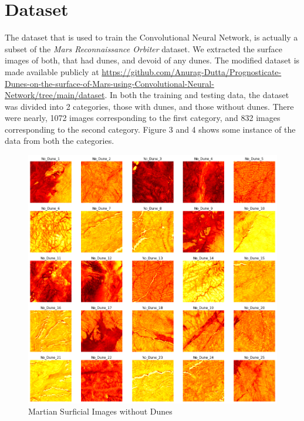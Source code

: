 \documentclass[conference]{IEEEtran}
\begin{document}
\section{Dataset}
The dataset that is used to train the Convolutional Neural Network, is actually a subset of the \textit{Mars Reconnaissance Orbiter} dataset. We extracted the surface images of both, that had dunes, and devoid of any dunes. The modified dataset is made available publicly at \href{https://github.com/Anurag-Dutta/Prognosticate-Dunes-on-the-surface-of-Mars-using-Convolutional-Neural-Network/tree/main/dataset}{https://github.com/Anurag-Dutta/Prognosticate-Dunes-on-the-surface-of-Mars-using-Convolutional-Neural-Network/tree/main/dataset}. In both the training and testing data, the dataset was divided into 2 categories, those with dunes, and those without dunes. There were nearly, 1072 images corresponding to the first category, and 832 images corresponding to the second category. Figure 3 and 4 shows some instance of the data from both the categories. 
\begin{figure}[htbp]
\label{fig3}
\centerline{\includegraphics[width = \linewidth]{3}}
\caption{Martian Surficial Images without Dunes}
\end{figure}
\end{document}
